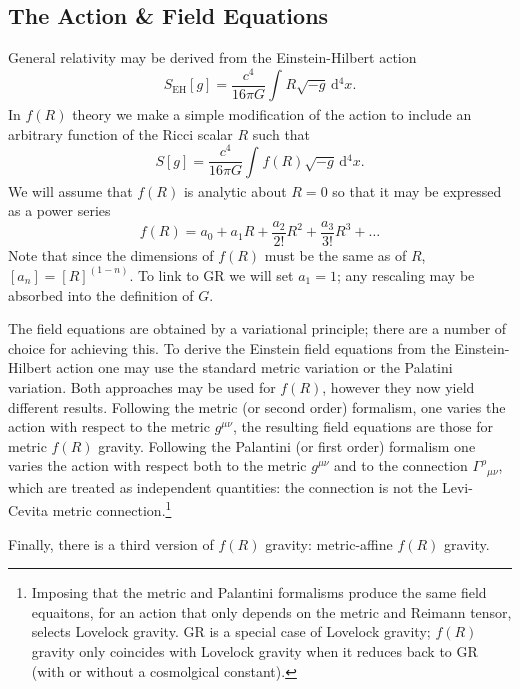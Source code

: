 \documentclass[a4paper, 11pt, titlepage, twoside]{report}
\newcommand{\sub}[1]{\ensuremath{_\mathrm{#1}}}
\newcommand{\dd}{\ensuremath{\mathrm{d}}}
\newcommand{\intd}[4]{\ensuremath{\int_{#1}^{#2}{#3}\,\dd{#4}}}
\begin{document}
\subsection{The Action \& Field Equations}

General relativity may be derived from the Einstein-Hilbert action\cite{Misner1973, Landau1975}
\begin{equation}
S\sub{EH}[g] = \frac{c^4}{16\pi G}\intd{}{}{R\sqrt{-g}}{^4x}.
\end{equation}
In $f(R)$ theory we make a simple modification of the action to include an arbitrary function of the Ricci scalar $R$ such that\cite{Buchdahl1970}
\begin{equation}
S[g] = \frac{c^4}{16\pi G}\intd{}{}{f(R)\sqrt{-g}}{^4x}.
\end{equation}
We will assume that $f(R)$ is analytic about $R = 0$ so that it may be expressed as a power series\cite{Psaltis2008}
\begin{equation}
f(R) = a_0 + a_1 R + \frac{a_2}{2!}R^2 + \frac{a_3}{3!}R^3 + \ldots
\end{equation}
Note that since the dimensions of $f(R)$ must be the same as of $R$, $[a_n] = [R]^{(1-n)}$. To link to GR we will set $a_1 = 1$; any rescaling may be absorbed into the definition of $G$.

The field equations are obtained by a variational principle; there are a number of choice for achieving this. To derive the Einstein field equations from the Einstein-Hilbert action one may use the standard metric variation or the Palatini variation\cite{Misner1973}. Both approaches may be used for $f(R)$, however they now yield different results\cite{Sotirou2010, DeFelice2010}. Following the metric (or second order) formalism, one varies the action with respect to the metric $g^{\mu\nu}$, the resulting field equations are those for metric $f(R)$ gravity. Following the Palantini (or first order) formalism one varies the action with respect both to the metric $g^{\mu\nu}$ and to the connection ${\Gamma^\rho}_{\mu\nu}$, which are treated as independent quantities: the connection is not the Levi-Cevita metric connection.\footnote{Imposing that the metric and Palantini formalisms produce the same field equaitons, for an action that only depends on the metric and Reimann tensor, selects Lovelock gravity\cite{Exirifard2007}. GR is a special case of Lovelock gravity; $f(R)$ gravity only coincides with Lovelock gravity when it reduces back to GR (with or without a cosmolgical constant).}

Finally, there is a third version of $f(R)$ gravity: metric-affine $f(R)$ gravity. 
\end{document}
